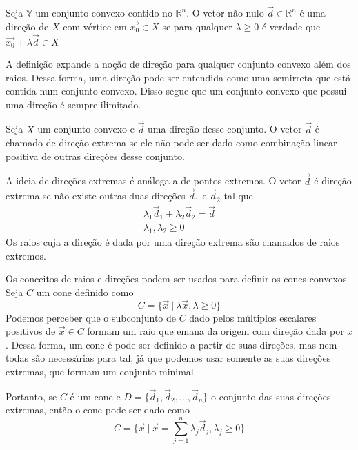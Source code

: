 \begin{def:direção}
	Seja $\mathbb{V}$ um conjunto convexo contido no $\mathbb{R}^n$. O vetor não nulo $\vec{d} \in \mathbb{R}^n$ é uma direção de $X$ com vértice em $\vec{x_0} \in X$ se para qualquer $\lambda \geq 0$ é verdade que $\vec{x_0} + \lambda \vec{d} \in X$  
\end{def:direção}

A definição expande a noção de direção para qualquer conjunto convexo além dos raios. Dessa forma, uma direção pode ser entendida como uma semirreta que está contida num conjunto convexo. Disso segue que um conjunto convexo que possui uma direção é sempre ilimitado.

\begin{def:direção extrema}
	Seja $X$ um conjunto convexo e $\vec{d}$ uma direção desse conjunto. O vetor $\vec{d}$ é chamado de direção extrema se ele não pode ser dado como combinação linear positiva de outras direções desse conjunto.
\end{def:direção extrema}

A ideia de direções extremas é análoga a de pontos extremos. O vetor $\vec{d}$ é direção extrema se não existe outras duas direções $\vec{d}_1$ e $\vec{d}_2$ tal que
\begin{gather*}
	\lambda_1\vec{d}_1 + \lambda_2\vec{d}_2 = \vec{d} \\
	\lambda_1, \lambda_2 \geq 0
\end{gather*}
Os raios cuja a direção é dada por uma direção extrema são chamados de raios extremos.

Os conceitos de raios e direções podem ser usados para definir os cones convexos. Seja $C$ um cone definido como \[C = \{\vec{x}\ |\ \lambda\vec{x}, \lambda \geq 0\}\]Podemos perceber que o subconjunto de $C$ dado pelos múltiplos escalares positivos de $\vec{x} \in C$ formam um raio que emana da origem com direção dada por $x$. Dessa forma, um cone é pode ser definido a partir de suas direções, mas nem todas são necessárias para tal, já que podemos usar somente as suas direções extremas, que formam um conjunto minimal.

Portanto, se $C$ é um cone e $D = \{\vec{d}_1, \vec{d}_2, \ldots, \vec{d}_n\}$ o conjunto das suas direções extremas, então o cone pode ser dado como
\begin{equation*}
	C = \{\vec{x}\ |\ \vec{x} = \displaystyle\sum_{j = 1}^{n}
			\lambda_j \vec{d}_j, \lambda_j \geq 0\}
\end{equation*} 

